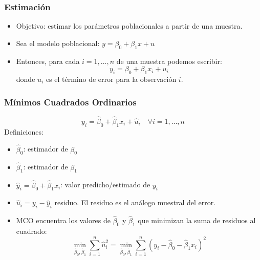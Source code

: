 \documentclass{beamer}
\begin{document}
\begin{frame}
	\frametitle{Estimaci\'on} %
\begin{itemize}
  \item Objetivo: estimar los parámetros poblacionales a partir de una muestra.
  \item Sea el modelo poblacional: $y = \beta_0 + \beta_1x + u$
  \item Entonces, para cada $i = 1, \ldots, n$ de una muestra podemos escribir:
  \begin{equation*}
    y_i = \beta_0 + \beta_1x_i + u_i
  \end{equation*}
  donde $u_i$ es el término de error para la observación $i$.
\end{itemize}
\end{frame}	

\begin{frame}
	\frametitle{Mínimos Cuadrados Ordinarios}  %
\[ {y}_i = \hat{\beta}_0 + \hat{\beta}_1 x_i + \hat{u}_i \quad \forall i = 1, \ldots, n \]
Definiciones:
\begin{itemize}
    \item $\hat{\beta}_0$: estimador de $\beta_0$
    \item $\hat{\beta}_1$: estimador de $\beta_1$
    \item $\hat{y}_i = \hat{\beta}_0 + \hat{\beta}_1 x_i$: valor predicho/estimado de $y_i$
    \item $\hat{u}_i = y_i - \hat{y}_i$ residuo. El residuo es el análogo muestral del error.
    \item MCO encuentra los valores de \(\hat{\beta}_0\) y \(\hat{\beta}_1\) que minimizan la suma de residuos al cuadrado:
\[ \min_{\hat{\beta}_0, \hat{\beta}_1} \sum_{i=1}^{n} \hat{u}_i^2 = \min_{\hat{\beta}_0, \hat{\beta}_1} \sum_{i=1}^{n} (y_i - \hat{\beta}_0 - \hat{\beta}_1 x_i)^2 \]
\end{itemize}
\end{frame}	
\end{document}
